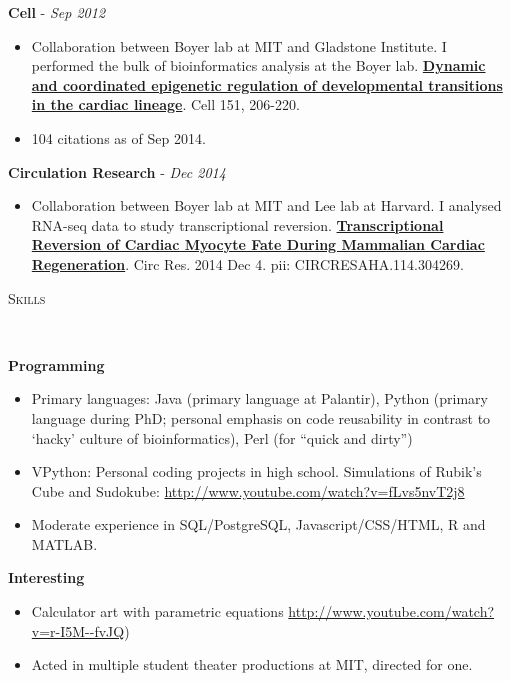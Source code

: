 \documentclass{article}
\newenvironment{changemargin}[2]{%
  \begin{list}{}{%
    \setlength{\topsep}{0pt}%
    \setlength{\leftmargin}{#1}%
    \setlength{\rightmargin}{#2}%
    \setlength{\listparindent}{\parindent}%
    \setlength{\itemindent}{\parindent}%
    \setlength{\parsep}{\parskip}%
  }%
  \item[]}{\end{list}
}
\newcommand{\lineover}{
	\begin{changemargin}{-0.05in}{-0.05in}
		\vspace*{-8pt}
		\hrulefill \\
		\vspace*{-2pt}
	\end{changemargin}
}
\newcommand{\header}[1]{
	\begin{changemargin}{-0.5in}{-0.5in}
		\scshape{#1}\\
  	\lineover
	\end{changemargin}
}
\newenvironment{body} {
	\vspace*{-16pt}
	\begin{changemargin}{-0.25in}{-0.5in}
  }	
	{\end{changemargin}
}
\begin{document}
\begin{body}
	\small{
	\vspace{17pt}
	\textbf{Cell} -  \emph{Sep 2012} \\
   \begin{itemize}
   	   \item Collaboration between Boyer lab at MIT and Gladstone Institute. I performed the bulk of bioinformatics analysis at the Boyer lab. \href{http://www.ncbi.nlm.nih.gov/pubmed/22981692}{\bf Dynamic and coordinated epigenetic regulation of developmental transitions in the cardiac lineage}.
	  Cell 151, 206-220.\\
	  \item 104 citations as of Sep 2014.   
   \end{itemize}
	\textbf{Circulation Research} -  \emph{Dec 2014} \\
   \begin{itemize}
   	   \item Collaboration between Boyer lab at MIT and Lee lab at Harvard. I analysed RNA-seq data to study transcriptional reversion. \href{http://www.ncbi.nlm.nih.gov/pubmed/25477501}{\bf Transcriptional Reversion of Cardiac Myocyte Fate During Mammalian Cardiac Regeneration}. Circ Res. 2014 Dec 4. pii: CIRCRESAHA.114.304269. 
   \end{itemize}
   
   }
   
\end{body}


\header{Skills}

\begin{body}
	\small{
	\vspace{17pt}
	\textbf{Programming}
	\begin{itemize}
	      \item Primary languages: Java (primary language at Palantir), Python (primary language during PhD; personal emphasis on code reusability in contrast to `hacky' culture of bioinformatics), Perl (for ``quick and dirty'')
		  \item VPython: Personal coding projects in high school. Simulations of Rubik's Cube and Sudokube: \href{http://www.youtube.com/watch?v=fLvs5nvT2j8}{http://www.youtube.com/watch?v=fLvs5nvT2j8}
		  \item Moderate experience in SQL/PostgreSQL, Javascript/CSS/HTML, R and MATLAB.
	\end{itemize}
	\textbf{Interesting}
	\begin{itemize}
	      \item Calculator art with parametric equations \href{http://www.youtube.com/watch?v=r-I5M--fvJQ}{http://www.youtube.com/watch?v=r-I5M-\--fvJQ})
	      \item Acted in multiple student theater productions at MIT, directed for one.
	\end{itemize}
	}
\end{body}
\end{document}
